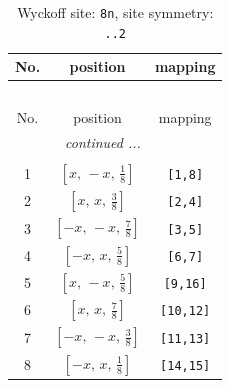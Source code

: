 \documentclass[fleqn,8pt]{jsarticle}
\begin{document}
\begin{longtable}{ccc}
\caption{Wyckoff site: {\tt 8n}, site symmetry: {\tt ..2}}
 \\
 \hline \hline
No. & position & mapping \\ \hline \endfirsthead

\multicolumn{2}{l}{\tablename\ \thetable{}} \\
 \hline \hline
No. & position & mapping \\ \hline \endhead

 \hline \hline
\multicolumn{2}{r}{\footnotesize\it continued ...} \\ \endfoot

 \hline \hline
\multicolumn{2}{r}{} \\ \endlastfoot

1 & $\left[ x,\, - x,\, \frac{1}{8} \right]$ & {\tt [1,8]} \\ \hline
2 & $\left[ x,\, x,\, \frac{3}{8} \right]$ & {\tt [2,4]} \\ \hline
3 & $\left[ - x,\, - x,\, \frac{7}{8} \right]$ & {\tt [3,5]} \\ \hline
4 & $\left[ - x,\, x,\, \frac{5}{8} \right]$ & {\tt [6,7]} \\ \hline
5 & $\left[ x,\, - x,\, \frac{5}{8} \right]$ & {\tt [9,16]} \\ \hline
6 & $\left[ x,\, x,\, \frac{7}{8} \right]$ & {\tt [10,12]} \\ \hline
7 & $\left[ - x,\, - x,\, \frac{3}{8} \right]$ & {\tt [11,13]} \\ \hline
8 & $\left[ - x,\, x,\, \frac{1}{8} \right]$ & {\tt [14,15]} \\
\end{longtable}
\renewcommand{\arraystretch}{1.2}
\end{document}

